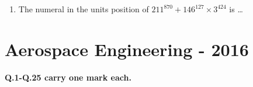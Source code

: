 \documentclass[journal,12pt,onecolumn]{IEEEtran}
\theoremstyle{remark}
\begin{document}
\begin{enumerate}
\begin{enumerate}
\end{enumerate}

\item The numeral in the units position of $211^{870} + 146^{127} \times 3^{424}$ is \dots
    
\end{enumerate}
\newpage

    \section{Aerospace Engineering - 2016}
\textbf{Q.1-Q.25 carry one mark each.}
\end{document}
